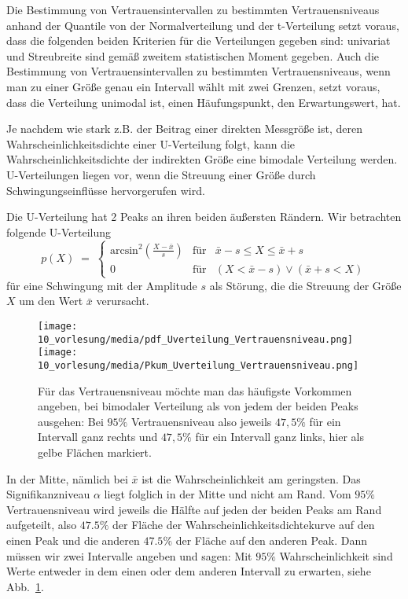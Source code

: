 Die Bestimmung von Vertrauensintervallen zu bestimmten Vertrauensniveaus anhand der Quantile
von der Normalverteilung und der t-Verteilung setzt voraus, dass die folgenden beiden Kriterien für die Verteilungen gegeben sind: univariat und Streubreite sind gemäß zweitem statistischen Moment gegeben. Auch die Bestimmung von Vertrauensintervallen zu bestimmten Vertrauensniveaus, wenn man
zu einer Größe genau ein Intervall wählt mit zwei Grenzen, setzt voraus, dass die Verteilung unimodal ist, einen Häufungspunkt, den Erwartungswert, hat.

Je nachdem wie stark z.B. der Beitrag einer direkten Messgröße ist, deren Wahrscheinlichkeitsdichte
einer U-Verteilung folgt, kann die Wahrscheinlichkeitsdichte der indirekten Größe
eine bimodale Ver\-teilung werden. U-Verteilungen liegen vor, wenn die Streuung einer Größe
durch Schwingungseinflüsse hervorgerufen wird.

Die U-Verteilung hat 2 Peaks an ihren beiden äußersten Rändern.
Wir betrachten folgende U-Verteilung
\begin{equation}
p(X) \; = \; \left\{\begin{array}{lll}
\mathrm{arcsin}^2\left(\frac{X - \bar x}{s}\right) & \text{für} & \bar x - s  \leq X \leq \bar x + s\\
0 & \text{für} & (X < \bar x - s) \vee (\bar x + s < X)
\end{array}\right. 
\label{uverteilung}
\end{equation}
für eine Schwingung mit der Amplitude $s$ als Störung, die die Streuung der Größe $X$
um den Wert $\bar x$ verursacht.
\begin{figure}
	\begin{center}
 		\texttt{[image: 10\_vorlesung/media/pdf\_Uverteilung\_Vertrauensniveau.png]}
 		\hspace{2mm}
	\texttt{[image: 10\_vorlesung/media/Pkum\_Uverteilung\_Vertrauensniveau.png]}
		\caption{Für das Vertrauensniveau möchte man das häufigste Vorkommen angeben, bei
			bimodaler Verteilung als von jedem der beiden Peaks ausgehen: Bei $95 \%$
			Vertrauensniveau also jeweils $47,5 \%$ für ein Intervall ganz rechts und
			$47,5 \%$ für ein Intervall ganz links, hier als gelbe Flächen markiert.}
		\label{Uverteilungsquantile}
	\end{center}
\end{figure}
In der Mitte, nämlich bei $\bar x$ ist die Wahrscheinlichkeit am geringsten.
Das Signifikanzniveau $\alpha$ liegt folglich in der Mitte und nicht am Rand.
Vom $95 \%$ Vertrauensniveau wird jeweils die Hälfte auf jeden der beiden
Peaks am Rand aufgeteilt, also $47.5 \%$ der Fläche der 
Wahrscheinlichkeitsdichtekurve auf den einen Peak und die anderen $47.5 \%$ der Fläche auf den anderen
Peak. Dann müssen wir zwei Intervalle angeben und sagen: Mit $95 \%$ Wahrscheinlichkeit sind
Werte entweder in dem einen oder dem anderen Intervall zu erwarten, siehe Abb.~\ref{Uverteilungsquantile}.

